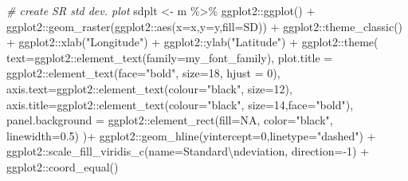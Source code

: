 \documentclass[
]{article}
\newenvironment{Shaded}{\begin{snugshade}}{\end{snugshade}}
\newcommand{\AttributeTok}[1]{\textcolor[rgb]{0.77,0.63,0.00}{#1}}
\newcommand{\CommentTok}[1]{\textcolor[rgb]{0.56,0.35,0.01}{\textit{#1}}}
\newcommand{\ConstantTok}[1]{\textcolor[rgb]{0.00,0.00,0.00}{#1}}
\newcommand{\DecValTok}[1]{\textcolor[rgb]{0.00,0.00,0.81}{#1}}
\newcommand{\FloatTok}[1]{\textcolor[rgb]{0.00,0.00,0.81}{#1}}
\newcommand{\FunctionTok}[1]{\textcolor[rgb]{0.00,0.00,0.00}{#1}}
\newcommand{\NormalTok}[1]{#1}
\newcommand{\OtherTok}[1]{\textcolor[rgb]{0.56,0.35,0.01}{#1}}
\newcommand{\SpecialCharTok}[1]{\textcolor[rgb]{0.00,0.00,0.00}{#1}}
\newcommand{\StringTok}[1]{\textcolor[rgb]{0.31,0.60,0.02}{#1}}
\begin{document}
\begin{Shaded}
\begin{Highlighting}[]
\CommentTok{\# create SR std dev. plot}
\NormalTok{sdplt }\OtherTok{\textless{}{-}}\NormalTok{ m }\SpecialCharTok{\%\textgreater{}\%}
\NormalTok{  ggplot2}\SpecialCharTok{::}\FunctionTok{ggplot}\NormalTok{() }\SpecialCharTok{+}
\NormalTok{  ggplot2}\SpecialCharTok{::}\FunctionTok{geom\_raster}\NormalTok{(ggplot2}\SpecialCharTok{::}\FunctionTok{aes}\NormalTok{(}\AttributeTok{x=}\NormalTok{x,}\AttributeTok{y=}\NormalTok{y,}\AttributeTok{fill=}\NormalTok{SD)) }\SpecialCharTok{+}
\NormalTok{  ggplot2}\SpecialCharTok{::}\FunctionTok{theme\_classic}\NormalTok{() }\SpecialCharTok{+}
\NormalTok{  ggplot2}\SpecialCharTok{::}\FunctionTok{xlab}\NormalTok{(}\StringTok{"Longitude"}\NormalTok{) }\SpecialCharTok{+}\NormalTok{ ggplot2}\SpecialCharTok{::}\FunctionTok{ylab}\NormalTok{(}\StringTok{"Latitude"}\NormalTok{) }\SpecialCharTok{+}
\NormalTok{  ggplot2}\SpecialCharTok{::}\FunctionTok{theme}\NormalTok{(}
    \AttributeTok{text=}\NormalTok{ggplot2}\SpecialCharTok{::}\FunctionTok{element\_text}\NormalTok{(}\AttributeTok{family=}\NormalTok{my\_font\_family),}
    \AttributeTok{plot.title =}\NormalTok{ ggplot2}\SpecialCharTok{::}\FunctionTok{element\_text}\NormalTok{(}\AttributeTok{face=}\StringTok{"bold"}\NormalTok{, }\AttributeTok{size=}\DecValTok{18}\NormalTok{, }\AttributeTok{hjust =} \DecValTok{0}\NormalTok{),}
    \AttributeTok{axis.text=}\NormalTok{ggplot2}\SpecialCharTok{::}\FunctionTok{element\_text}\NormalTok{(}\AttributeTok{colour=}\StringTok{"black"}\NormalTok{, }\AttributeTok{size=}\DecValTok{12}\NormalTok{),}
    \AttributeTok{axis.title=}\NormalTok{ggplot2}\SpecialCharTok{::}\FunctionTok{element\_text}\NormalTok{(}\AttributeTok{colour=}\StringTok{"black"}\NormalTok{, }\AttributeTok{size=}\DecValTok{14}\NormalTok{,}\AttributeTok{face=}\StringTok{"bold"}\NormalTok{),}
    \AttributeTok{panel.background =}\NormalTok{ ggplot2}\SpecialCharTok{::}\FunctionTok{element\_rect}\NormalTok{(}\AttributeTok{fill=}\ConstantTok{NA}\NormalTok{, }\AttributeTok{color=}\StringTok{"black"}\NormalTok{, }\AttributeTok{linewidth=}\FloatTok{0.5}\NormalTok{)}
\NormalTok{  )}\SpecialCharTok{+}
\NormalTok{  ggplot2}\SpecialCharTok{::}\FunctionTok{geom\_hline}\NormalTok{(}\AttributeTok{yintercept=}\DecValTok{0}\NormalTok{,}\AttributeTok{linetype=}\StringTok{"dashed"}\NormalTok{) }\SpecialCharTok{+} 
\NormalTok{  ggplot2}\SpecialCharTok{::}\FunctionTok{scale\_fill\_viridis\_c}\NormalTok{(}\AttributeTok{name=}\StringTok{\textquotesingle{}Standard}\SpecialCharTok{\textbackslash{}n}\StringTok{deviation\textquotesingle{}}\NormalTok{, }\AttributeTok{direction=}\SpecialCharTok{{-}}\DecValTok{1}\NormalTok{) }\SpecialCharTok{+}
\NormalTok{  ggplot2}\SpecialCharTok{::}\FunctionTok{coord\_equal}\NormalTok{()}


\end{Highlighting}
\end{Shaded}
\end{document}
